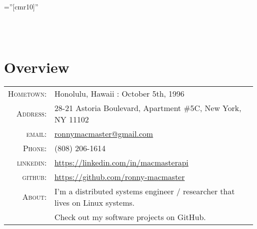 \documentclass[a4paper,10pt]{article}
\begin{document}
\pagestyle{empty} %

\font\fb=''[cmr10]'' %

\par{\centering
	{} \\\vspace{2mm}
	{} \\\vspace{2mm}
\par}

\section{Overview}
\begin{tabular}{rl}
  \textsc{Hometown:} & Honolulu, Hawaii : October 5th, 1996 \\
  \textsc{Address:} & 28-21 Astoria Boulevard, Apartment \#5C, New York, NY 11102 \\
	\textsc{email:} & \href{mailto:ronnymacmaster@gmail.com}{ronnymacmaster@gmail.com} \\
	\textsc{Phone:} & (808) 206-1614 \\ 
	\textsc{linkedin:} & \href{https://linkedin.com/in/macmasterapi}{https://linkedin.com/in/macmasterapi} \\
	\textsc{\color{medRed}github:} & \href{https://github.com/ronny-macmaster}{https://github.com/ronny-macmaster}
  \vspace{1mm} \\
  \textsc{About:}	& I'm a distributed systems engineer / researcher that lives on Linux systems. \\
    & Check out my software projects on GitHub.
\end{tabular}

\end{document}
